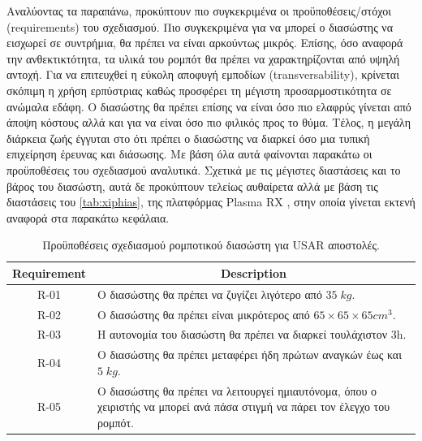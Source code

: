 Αναλύοντας τα παραπάνω, προκύπτουν πιο συγκεκριμένα οι προϋποθέσεις/στόχοι (requirements) του σχεδιασμού. Πιο συγκεκριμένα για να μπορεί ο διασώστης να εισχωρεί σε συντρήμια, θα πρέπει να είναι αρκούντως μικρός. Επίσης, όσο αναφορά την ανθεκτικτότητα, τα υλικά του ρομπότ θα πρέπει να χαρακτηρίζονται από υψηλή αντοχή. Για να επιτευχθεί η εύκολη αποφυγή εμποδίων (transversability), κρίνεται σκόπιμη η χρήση ερπύστριας καθώς προσφέρει τη μέγιστη προσαρμοστικότητα σε ανώμαλα εδάφη. Ο διασώστης θα πρέπει επίσης να είναι όσο πιο ελαφρύς γίνεται από άποψη κόστους αλλά και για να είναι όσο πιο φιλικός προς το θύμα. Τέλος, η μεγάλη διάρκεια ζωής έγγυται στο ότι πρέπει ο διασώστης να διαρκεί όσο μια τυπική επιχείρηση έρευνας και διάσωσης. Με βάση όλα αυτά φαίνονται παρακάτω οι προϋποθέσεις του σχεδιασμού αναλυτικά. Σχετικά με τις μέγιστες διαστάσεις και το βάρος του διασώστη, αυτά δε προκύπτουν τελείως αυθαίρετα αλλά με βάση τις διαστάσεις του \ref{tab:xiphias}, της πλατφόρμας Plasma RX \cite{plasmaRX19}, στην οποία γίνεται εκτενή αναφορά στα παρακάτω κεφάλαια.
\begin{table}[H]
    \centering
        \begin{tabular}{|c|p{13cm}|}
        \hline
        \rowcolor{Dandelion}
        Requirement & \multicolumn{1}{c|}{Description}\\
        \hline
        R-01 & Ο διασώστης θα πρέπει να ζυγίζει λιγότερο από $35\; kg$.\\
        \hline
        R-02 & Ο διασώστης θα πρέπει είναι μικρότερος από $65\times 65 \times 65 cm^3$.\\
        \hline
        R-03 & Η αυτονομία του διασώστη θα πρέπει να διαρκεί τουλάχιστον 3h.\\
        \hline
        R-04 & Ο διασώστης θα πρέπει μεταφέρει ήδη πρώτων αναγκών έως και $5\; kg$.\\
        \hline
        R-05 & Ο διασώστης θα πρέπει να λειτουργεί ημιαυτόνομα, όπου ο χειριστής να μπορεί ανά πάσα στιγμή να πάρει τον έλεγχο του ρομπότ.\\
        \hline
        \end{tabular}
    \caption{Προϋποθέσεις σχεδιασμού ρομποτικού διασώστη για USAR αποστολές.}
    \label{tab:reqs}
\end{table}




